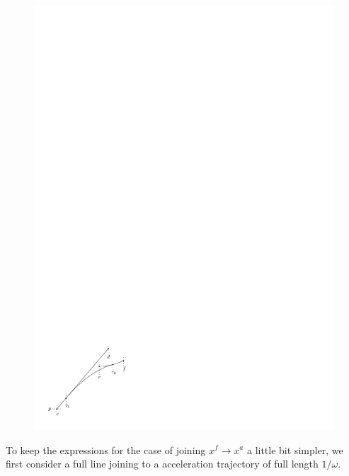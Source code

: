 \documentclass[a4paper]{article}
\theoremstyle{definition}
\theoremstyle{plain}
\begin{document}
\begin{figure}
\begin{minipage}{.45\textwidth}
  \includegraphics[width=0.9\linewidth]{figures/motion/lemma_full_acc}
  \label{fig:full_acc}
\end{minipage}
\end{figure}

To keep the expressions for the case of joining $x^{f} \rightarrow x^{a}$ a
little bit simpler, we first consider a full line joining to a acceleration
trajectory of full length $1/\omega$.
\end{document}
